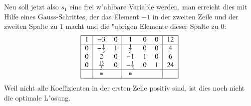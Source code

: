 Neu soll jetzt also $s_1$ eine frei w"ahlbare Variable werden, man
erreicht dies mit Hilfe eines Gauss-Schrittes, der das Element $-1$
in der zweiten Zeile und der zweiten Spalte zu $1$ macht und die "ubrigen
Elemente dieser Spalte zu $0$:
\[
\begin{tabular}{|>{$}c<{$}|>{$}c<{$}>{$}c<{$}|>{$}c<{$}>{$}c<{$}>{$}c<{$}|>{$}c<{$}|}
\hline
1&        -3& 0&       1& 0& 0& 12\\
\hline
0&  -\frac13& 1& \frac13& 0& 0&  4\\
0&         2& 0&      -1& 1& 0&  6\\
0&\frac{13}3& 0&-\frac13& 0& 1& 24\\
\hline
 & *&  & *&  &  &  \\
\hline
\end{tabular}
\]
Weil nicht alle Koeffizienten in der ersten Zeile positiv sind,
ist dies noch nicht die optimale L"osung.

